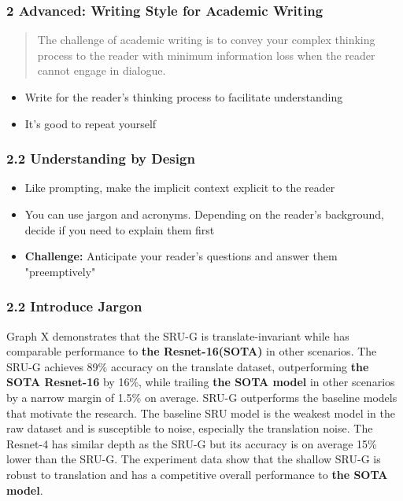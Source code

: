 \documentclass{beamer}
\begin{document}
    \begin{frame}
    \frametitle{2 Advanced: Writing Style for Academic Writing}
    \begin{quote}
        The challenge of academic writing is to convey your complex thinking process to the reader with minimum information loss when the reader cannot engage in dialogue.
    \end{quote}
    \begin{itemize}
        \item Write for the reader's thinking process to facilitate understanding
        \item It's good to repeat yourself
    \end{itemize}
    \end{frame}

        
    \begin{frame}
      \frametitle{2.2 Understanding by Design}
      \begin{itemize}[<+->]
          \item Like prompting, make the implicit context explicit to the reader
          \item You can use jargon and acronyms. Depending on the reader's background, decide if you need to explain them first
          \item \textbf{Challenge:} Anticipate your reader's questions and answer them "preemptively"
      \end{itemize}
  \end{frame}


  \begin{frame}
    \frametitle{2.2 Introduce Jargon}
    Graph X demonstrates that the SRU-G is translate-invariant while has comparable performance to \textbf{the Resnet-16(SOTA)} in other scenarios.
    The SRU-G achieves 89\% accuracy on the translate dataset, outperforming \textbf{the SOTA Resnet-16} by 16\%, while trailing \textbf{the SOTA model} in other scenarios by a narrow margin of 1.5\% on average.
    SRU-G outperforms the baseline models that motivate the research. The baseline SRU model is the weakest model in the raw dataset and is susceptible to noise, especially the translation noise. The Resnet-4 has similar depth as the SRU-G but its accuracy is on average 15\% lower than the SRU-G.
    The experiment data show that the shallow SRU-G is robust to translation and has a competitive overall performance to \textbf{the SOTA model}.
    \end{frame}
    
\end{document}
